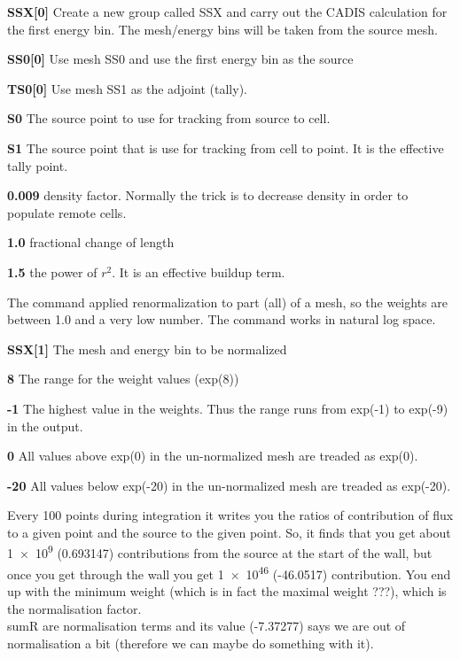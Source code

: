 \begin{description}
\begin{description}
  \item {\bf SSX[0]} Create a new group called SSX and carry out the
    CADIS calculation for the first energy bin. The mesh/energy bins
    will be taken from the source mesh.    
  \item {\bf SS0[0]} Use mesh SS0 and use the first energy bin as the source
  \item {\bf TS0[0]} Use mesh SS1 as the adjoint (tally).
  \item {\bf S0} The source point to use for tracking from source to cell.
  \item {\bf S1} The source point that is use for tracking from cell to point. It is the effective
    tally point.
  \item {\bf 0.009} density factor. Normally the trick is to decrease density in order to populate remote cells.
  \item {\bf 1.0} fractional change of length
  \item {\bf 1.5} the power of $r^2$. It is an effective buildup term.
\end{description}


\item[--wwgNORM] The command applied renormalization to part (all) of a mesh, so the weights
  are between 1.0 and a very low number. The command works in natural log space.
\begin{description}
  \item {\bf SSX[1]} The mesh and energy bin to be normalized
  \item {\bf 8} The range for the weight values (exp(8))
  \item {\bf -1} The highest value in the weights.
       Thus the range runs from exp(-1) to exp(-9) in the output.
  \item {\bf 0} All values above exp(0) in the un-normalized mesh are
       treaded as exp(0).
  \item {\bf -20} All values below exp(-20) in the un-normalized mesh are treaded as exp(-20).
\end{description}

\end{description}

Every 100 points during integration it writes you the ratios of
contribution of flux to a given point and the source to the given
point.  So, it finds that you get about
\num[retain-unity-mantissa=false]{1e9} (0.693147)  contributions from the source at the start
of the wall, but once you get through the wall you get
\num[retain-unity-mantissa=false]{1e46} (-46.0517) contribution.  You
end up with the minimum weight (which is in fact the maximal weight
\alert{???}), which is the normalisation factor. \\ sumR are
normalisation terms and its value (-7.37277) says we are out of
normalisation a bit (therefore we can maybe do something with it).

